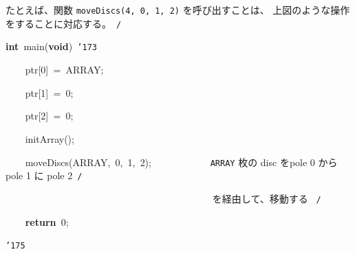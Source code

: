 \documentclass[a4paper,10pt]{article}
\def\mc{\relax}
\begin{document}
たとえば、関数 {\tt moveDiscs(4, 0, 1, 2)} を呼び出すことは、
上図のような操作をすることに対応する。\hfill \rm\mc \ {\tt *}{\tt /}
\tt\mc 

\noindent
\mbox{}\hfill

\noindent
\mbox{}\textbf{int}{\tt\mc \ }main(\textbf{void}){\tt\mc \ }{\tt\char'173}

\noindent
\mbox{}{\tt\mc \ }{\tt\mc \ }{\tt\mc \ }{\tt\mc \ }ptr[0]{\tt\mc \ }={\tt\mc \ }ARRAY;

\noindent
\mbox{}{\tt\mc \ }{\tt\mc \ }{\tt\mc \ }{\tt\mc \ }ptr[1]{\tt\mc \ }={\tt\mc \ }0;

\noindent
\mbox{}{\tt\mc \ }{\tt\mc \ }{\tt\mc \ }{\tt\mc \ }ptr[2]{\tt\mc \ }={\tt\mc \ }0;

\noindent
\mbox{}\hfill

\noindent
\mbox{}{\tt\mc \ }{\tt\mc \ }{\tt\mc \ }{\tt\mc \ }initArray();

\noindent
\mbox{}{\tt\mc \ }{\tt\mc \ }{\tt\mc \ }{\tt\mc \ }moveDiscs(ARRAY,{\tt\mc \ }0,{\tt\mc \ }1,{\tt\mc \ }2);{\tt\mc \ }{\tt\mc \ }{\tt\mc \ }{\tt\mc \ }{\tt\mc \ }{\tt\mc \ }{\tt\mc \ }{\tt\mc \ }{\tt\mc \ }{\tt\mc \ }\rm\mc {\tt /}{\tt *}\  \ {\tt ARRAY} 枚の disc をpole 0 から pole 1 に pole 2\hfill \rm\mc \ {\tt *}{\tt /}
\tt\mc 

\noindent
\mbox{}{\tt\mc \ }{\tt\mc \ }{\tt\mc \ }{\tt\mc \ }{\tt\mc \ }{\tt\mc \ }{\tt\mc \ }{\tt\mc \ }{\tt\mc \ }{\tt\mc \ }{\tt\mc \ }{\tt\mc \ }{\tt\mc \ }{\tt\mc \ }{\tt\mc \ }{\tt\mc \ }{\tt\mc \ }{\tt\mc \ }{\tt\mc \ }{\tt\mc \ }{\tt\mc \ }{\tt\mc \ }{\tt\mc \ }{\tt\mc \ }{\tt\mc \ }{\tt\mc \ }{\tt\mc \ }{\tt\mc \ }{\tt\mc \ }{\tt\mc \ }{\tt\mc \ }{\tt\mc \ }{\tt\mc \ }{\tt\mc \ }{\tt\mc \ }{\tt\mc \ }{\tt\mc \ }{\tt\mc \ }{\tt\mc \ }{\tt\mc \ }\rm\mc {\tt /}{\tt *}\  \ を経由して、移動する \hfill \rm\mc \ {\tt *}{\tt /}
\tt\mc 

\noindent
\mbox{}{\tt\mc \ }{\tt\mc \ }{\tt\mc \ }{\tt\mc \ }\textbf{return}{\tt\mc \ }0;

\noindent
\mbox{}{\tt\char'175}

\rm\mc
\end{document}
